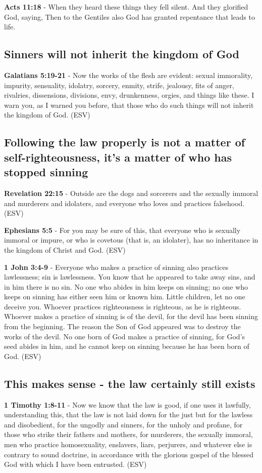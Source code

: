 \documentclass[11pt]{article}
\begin{document}
\textbf{Acts 11:18} - When they heard these things they fell silent. And they glorified God, saying, Then to the Gentiles also God has granted repentance that leads to life.

\subsection{Sinners will not inherit the kingdom of God}
\label{sec:orgf1a070a}
\textbf{Galatians 5:19-21} -  Now the works of the flesh are evident: sexual immorality, impurity, sensuality, idolatry, sorcery, enmity, strife, jealousy, fits of anger, rivalries, dissensions, divisions, envy, drunkenness, orgies, and things like these.  I warn you, as I warned you before, that those who do such things will not inherit the kingdom of God.  (ESV)

\subsection{Following the law properly is not a matter of self-righteousness, it's a matter of who has stopped sinning}
\label{sec:orge5f017a}
\textbf{Revelation 22:15} -  Outside are the dogs and sorcerers and the sexually immoral and murderers and idolaters, and everyone who loves and practices falsehood.  (ESV)

\textbf{Ephesians 5:5} -  For you may be sure of this, that everyone who is sexually immoral or impure, or who is covetous (that is, an idolater), has no inheritance in the kingdom of Christ and God.  (ESV)

\textbf{1 John 3:4-9} -  Everyone who makes a practice of sinning also practices lawlessness; sin is lawlessness.  You know that he appeared to take away sins, and in him there is no sin.  No one who abides in him keeps on sinning; no one who keeps on sinning has either seen him or known him.  Little children, let no one deceive you.  Whoever practices righteousness is righteous, as he is righteous.  Whoever makes a practice of sinning is of the devil, for the devil has been sinning from the beginning.  The reason the Son of God appeared was to destroy the works of the devil.  No one born of God makes a practice of sinning, for God's seed abides in him, and he cannot keep on sinning because he has been born of God.  (ESV)

\subsection{This makes sense - the law certainly still exists}
\label{sec:orge178957}
\textbf{1 Timothy 1:8-11} -  Now we know that the law is good, if one uses it lawfully, understanding this, that the law is not laid down for the just but for the lawless and disobedient, for the ungodly and sinners, for the unholy and profane, for those who strike their fathers and mothers, for murderers, the sexually immoral, men who practice homosexuality, enslavers, liars, perjurers, and whatever else is contrary to sound doctrine, in accordance with the glorious gospel of the blessed God with which I have been entrusted.  (ESV)
\end{document}
